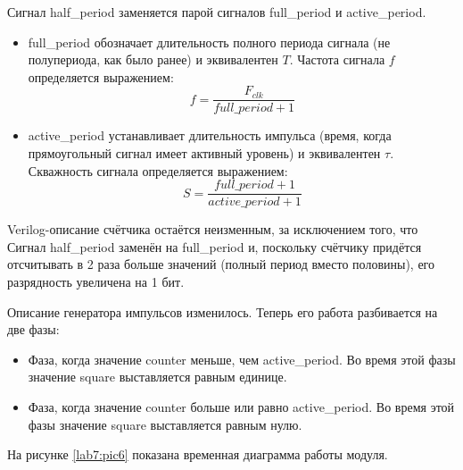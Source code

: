 Сигнал half\_period заменяется парой сигналов full\_period и active\_period. 

\begin{itemize}
\item full\_period обозначает длительность полного периода сигнала (не полупериода, как было ранее) и эквивалентен $T$. Частота сигнала $f$ определяется выражением:
$$ f = \frac{F_{clk}}{full\_period + 1} $$ 
\item active\_period устанавливает длительность импульса (время, когда прямоугольный сигнал имеет активный уровень) и эквивалентен $\tau$. Скважность сигнала определяется выражением:
$$ S = \frac{full\_period + 1}{active\_period + 1} $$
\end{itemize}


\noindent
\begin{minipage}{\linewidth}
	
\end{minipage}


Verilog-описание счётчика остаётся неизменным, за исключением того, что Сигнал half\_period заменён на full\_period и, поскольку счётчику придётся отсчитывать в 2 раза больше значений (полный период вместо половины), его разрядность увеличена на 1 бит.

\noindent
\begin{minipage}{\linewidth}
	
\end{minipage}


Описание генератора импульсов изменилось. Теперь его работа разбивается на две фазы:
\begin{itemize}
	\item Фаза, когда значение counter меньше, чем active\_period. Во время этой фазы значение square выставляется равным единице.
	\item Фаза, когда значение counter больше или равно active\_period. Во время этой фазы значение square выставляется равным нулю.
\end{itemize}

\noindent
\begin{minipage}{\linewidth}
	
\end{minipage}

На рисунке \ref{lab7:pic6} показана временная диаграмма работы модуля.

